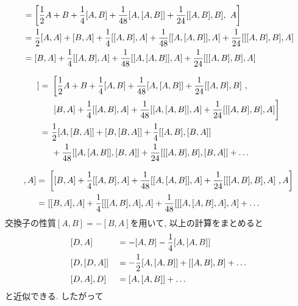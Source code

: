 \begin{align}
  [D, A]
  &=
  \left[
      \frac{1}{2}A + B
    + \frac{1}{4}[A, B]
    + \frac{1}{48}[A, [A,B]]
    + \frac{1}{24}[[A, B], B]
    ,~
    A
  \right]
  \notag \\
  &=
    \frac{1}{2} [A,A] + [B, A]
  + \frac{1}{4}[[A, B], A]
  + \frac{1}{48}[[A, [A,B]], A]
  + \frac{1}{24}[[[A,B], B], A]
  \notag \\
  &=
    [B,A]
  + \frac{1}{4}[[A, B], A]
  + \frac{1}{48}[[A, [A,B]], A]
  + \frac{1}{24}[[[A,B], B], A]
  \notag
\end{align}

\begin{align}
  [D, [D,A]]
  =~&
  \left[
    \frac{1}{2}A + B
    + \frac{1}{4}[A, B]
    + \frac{1}{48}[A, [A,B]]
    + \frac{1}{24}[[A, B], B]~,
  \right.
  \notag \\
  ~&
    \left.
    [B,A]
    + \frac{1}{4}[[A, B], A]
    + \frac{1}{48}[[A, [A,B]], A]
    + \frac{1}{24}[[[A,B], B], A]
  \right]
  \notag \\
  =~&
      \frac{1}{2}[A, [B,A]] + [B, [B,A]]
    + \frac{1}{4}[[A,B], [B,A]]
    \notag \\
    &
    + \frac{1}{48}[[A, [A,B]], [B,A]]
    + \frac{1}{24}[[[A,B],B], [B,A]]
    + \ldots
    \notag
\end{align}

\begin{align}
  [[D,A], A]
  =~&
  \left[
    [B,A]
    + \frac{1}{4}[[A, B], A]
    + \frac{1}{48}[[A, [A,B]], A]
    + \frac{1}{24}[[[A,B], B], A]
    ~,
    A
  \right]
  \notag \\
  =~&
    [[B,A], A]
  + \frac{1}{4} [[[A, B],A],A]
  + \frac{1}{48} [[[A, [A,B], A], A]
  + \ldots
  \notag
\end{align}
交換子の性質$[A, B] = -[B, A]$を用いて, 以上の計算をまとめると
\begin{alignat}{4}
  &[D, A]    &&= - [A,B] - \frac{1}{4}[A, [A,B]]
  \notag \\
  &[D,[D,A]] &&= -\frac{1}{2}[A, [A,B]] + [[A,B],B] + \ldots
  \notag \\
  &[D,A], D] &&=  [A, [A,B]] + \ldots
  \notag
\end{alignat}
と近似できる. したがって

